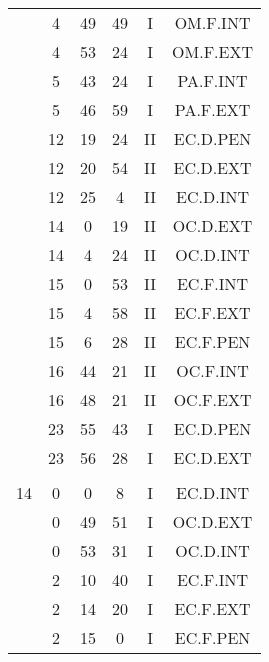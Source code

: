 \documentclass[12pt, a4paper]{article}
\begin{document}
\begin{multicols}{3}
{\begin{tabular}{c c c c c c}
	 	 	 	 & 4 & 49 & 49 & I & OM.F.INT\\%
	 	 	 	 & 4 & 53 & 24 & I & OM.F.EXT\\%
	 	 	 	 & 5 & 43 & 24 & I & PA.F.INT\\%
	 	 	 	 & 5 & 46 & 59 & I & PA.F.EXT\\%
	 	 	 	 & 12 & 19 & 24 & II & EC.D.PEN\\%
	 	 	 	 & 12 & 20 & 54 & II & EC.D.EXT\\%
	 	 	 	 & 12 & 25 & 4 & II & EC.D.INT\\%
	 	 	 	 & 14 & 0 & 19 & II & OC.D.EXT\\%
	 	 	 	 & 14 & 4 & 24 & II & OC.D.INT\\%
	 	 	 	 & 15 & 0 & 53 & II & EC.F.INT\\%
	 	 	 	 & 15 & 4 & 58 & II & EC.F.EXT\\%
	 	 	 	 & 15 & 6 & 28 & II & EC.F.PEN\\%
	 	 	 	 & 16 & 44 & 21 & II & OC.F.INT\\%
	 	 	 	 & 16 & 48 & 21 & II & OC.F.EXT\\%
	 	 	 	 & 23 & 55 & 43 & I & EC.D.PEN\\%
	 	 	 	 & 23 & 56 & 28 & I & EC.D.EXT\\%
	 	 	 	 & & & & & \\%
	 	 	 	14 & 0 & 0 & 8 & I & EC.D.INT\\%
	 	 	 	 & 0 & 49 & 51 & I & OC.D.EXT\\%
	 	 	 	 & 0 & 53 & 31 & I & OC.D.INT\\%
	 	 	 	 & 2 & 10 & 40 & I & EC.F.INT\\%
	 	 	 	 & 2 & 14 & 20 & I & EC.F.EXT\\%
	 	 	 	 & 2 & 15 & 0 & I & EC.F.PEN\\%

\end{tabular}}
\end{multicols}
\end{document}
